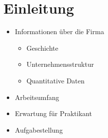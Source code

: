 \section{Einleitung}

\begin{itemize}
    \item Informationen über die Firma
    \begin{itemize}
        \item Geschichte
        \item Unternehmensstruktur
        \item Quantitative Daten
    \end{itemize}
    \item Arbeitsumfang
    \item Erwartung für Praktikant
    \item Aufgabestellung
\end{itemize}